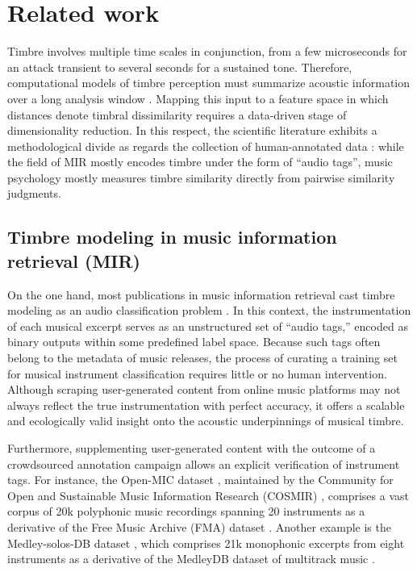 \documentclass{bmcart}
\newcommand{\ja}[1]{\textcolor{purple}{JA: #1}\xspace}
\newcommand{\nmu}{}
\begin{document}
\section*{\nmu Related work}
\label{sec:related-work}

Timbre involves multiple time scales in conjunction, from a few microseconds for an attack transient to several seconds for a sustained tone.
Therefore, computational models of timbre perception must summarize acoustic information over a long analysis window \cite{joder2009taslp}.
Mapping this input to a feature space in which distances denote timbral dissimilarity requires a data-driven stage of dimensionality reduction.
In this respect, the scientific literature exhibits a methodological divide as regards the collection of human-annotated data \cite{siedenburg2016jnmr}: while the field of MIR mostly encodes timbre under the form of ``audio tags'', music psychology mostly measures timbre similarity directly from pairwise similarity judgments.

\subsection*{Timbre modeling in music information retrieval (MIR)}
On the one hand, most publications in music information retrieval cast timbre modeling as an audio classification problem  \cite{martin1998asa,brown1999jasa,eronen2000icassp,herrera2003jnmr,wieczorkowska2003jiis,livshin2004dafx,krishna2004icassp,kaminskyj2005jiis,benetos2006icassp,bhalke2016jiis}.
In this context, the instrumentation of each musical excerpt serves as an unstructured set of ``audio tags,'' encoded as binary outputs within some predefined label space.
Because such tags often belong to the metadata of music releases, the process of curating a training set for musical instrument classification requires little or no human intervention.
Although scraping user-generated content from online music platforms may not always reflect the true instrumentation with perfect accuracy, it offers a scalable and ecologically valid insight onto the acoustic underpinnings of musical timbre.

Furthermore, supplementing user-generated content with the outcome of a crowdsourced annotation campaign allows an explicit verification of instrument tags.
For instance, the Open-MIC dataset \cite{humphrey2018ismir}, maintained by the Community for Open and Sustainable Music Information Research (COSMIR) \cite{mcfee2016ismir}, comprises a vast corpus of 20k polyphonic music recordings spanning 20 instruments as a derivative of the Free Music Archive (FMA) dataset \cite{defferrard2017ismir}. %
Another example is the Medley-solos-DB dataset \cite{lostanlen2016ismir}, which comprises 21k monophonic excerpts from eight instruments as a derivative of the MedleyDB dataset of multitrack music \cite{bittner2014ismir}.
\end{document}
